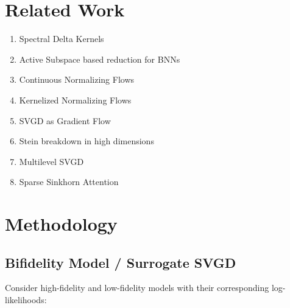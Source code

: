 \documentclass[12pt]{article}
\renewcommand{\[}{\left[}
\renewcommand{\]}{\right]}
\renewcommand{\(}{\left(}
\renewcommand{\)}{\right)}
\begin{document}
\section{Related Work}

\begin{enumerate}
    \item Spectral Delta Kernels \cite{lazaro-gredilla_sparse_2010}

    \item Active Subspace based reduction for BNNs \cite{jantre_learning_2023}

    \item Continuous Normalizing Flows \cite{grathwohl_ffjord_2018}

    \item Kernelized Normalizing Flows \cite{english_kernelised_2024}

    \item SVGD as Gradient Flow \cite{liu_stein_2017}

    \item Stein breakdown in high dimensions \cite{ba_towards_2019}


    \item Multilevel SVGD \cite{alsup_multilevel_2022}

    \item Sparse Sinkhorn Attention \cite{tay_sparse_2020}
\end{enumerate}

\section{Methodology}

\subsection{Bifidelity Model / Surrogate SVGD}

Consider high-fidelity and low-fidelity models with their corresponding log-likelihoods:
\end{document}
